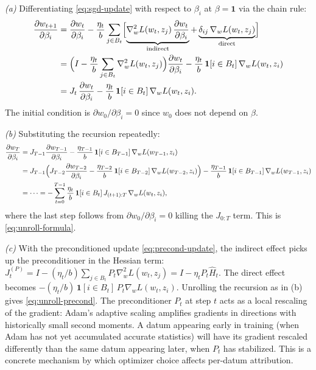 \documentclass[11pt]{article}
\begin{document}
\begin{solution}

\textit{(a)} Differentiating \eqref{eq:sgd-update} with respect to $\beta_i$ at $\beta = \mathbf{1}$ via the chain rule:
\begin{align*}
  \frac{\partial w_{t+1}}{\partial \beta_i} &= \frac{\partial w_t}{\partial \beta_i} - \frac{\eta_t}{b}\sum_{j\in B_t}\Bigl[\underbrace{\nabla_w^2 L(w_t,z_j)\,\frac{\partial w_t}{\partial \beta_i}}_{\text{indirect}} + \underbrace{\delta_{ij}\,\nabla_w L(w_t,z_j)}_{\text{direct}}\Bigr] \\
  &= \Bigl(I - \frac{\eta_t}{b}\sum_{j\in B_t}\nabla_w^2 L(w_t,z_j)\Bigr)\frac{\partial w_t}{\partial \beta_i} - \frac{\eta_t}{b}\,\mathbf{1}[i\in B_t]\,\nabla_w L(w_t,z_i) \\
  &= J_t\,\frac{\partial w_t}{\partial \beta_i} - \frac{\eta_t}{b}\,\mathbf{1}[i\in B_t]\,\nabla_w L(w_t,z_i).
\end{align*}
The initial condition is $\partial w_0/\partial \beta_i = 0$ since $w_0$ does not depend on $\beta$.

\textit{(b)} Substituting the recursion repeatedly:
\begin{align*}
  \frac{\partial w_T}{\partial \beta_i} &= J_{T-1}\frac{\partial w_{T-1}}{\partial \beta_i} - \frac{\eta_{T-1}}{b}\,\mathbf{1}[i\in B_{T-1}]\,\nabla_w L(w_{T-1},z_i) \\
  &= J_{T-1}\Bigl(J_{T-2}\frac{\partial w_{T-2}}{\partial \beta_i} - \frac{\eta_{T-2}}{b}\,\mathbf{1}[i\in B_{T-2}]\,\nabla_w L(w_{T-2},z_i)\Bigr) - \frac{\eta_{T-1}}{b}\,\mathbf{1}[i\in B_{T-1}]\,\nabla_w L(w_{T-1},z_i) \\
  &= \cdots = -\sum_{t=0}^{T-1}\frac{\eta_t}{b}\,\mathbf{1}[i\in B_t]\,J_{(t+1):T}\,\nabla_w L(w_t,z_i),
\end{align*}
where the last step follows from $\partial w_0/\partial \beta_i = 0$ killing the $J_{0:T}$ term. This is \eqref{eq:unroll-formula}.

\textit{(c)} With the preconditioned update \eqref{eq:precond-update}, the indirect effect picks up the preconditioner in the Hessian term: $J_t^{(P)} = I - (\eta_t/b)\sum_{j\in B_t}P_t\nabla_w^2 L(w_t,z_j) = I - \eta_t P_t \widehat{H}_t$. The direct effect becomes $-(\eta_t/b)\,\mathbf{1}[i\in B_t]\,P_t\nabla_w L(w_t,z_i)$. Unrolling the recursion as in (b) gives \eqref{eq:unroll-precond}. The preconditioner $P_t$ at step $t$ acts as a local rescaling of the gradient: Adam's adaptive scaling amplifies gradients in directions with historically small second moments. A datum appearing early in training (when Adam has not yet accumulated accurate statistics) will have its gradient rescaled differently than the same datum appearing later, when $P_t$ has stabilized. This is a concrete mechanism by which optimizer choice affects per-datum attribution.

\end{solution}
\end{document}
